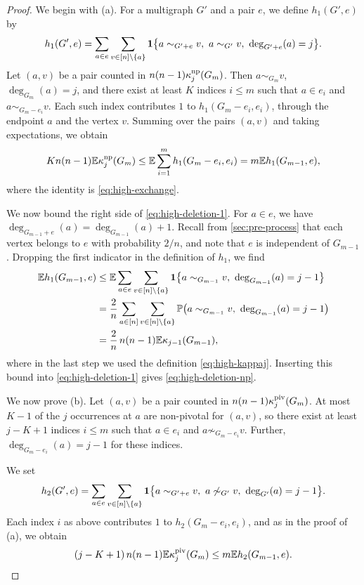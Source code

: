 \begin{proof}
We begin with (a). For a multigraph $G'$ and a pair $e$, we define $h_1(G', e)$ by
\[
h_1(G', e) = \sum_{a \in e} \sum_{v \in [n] \setminus \{a\}} \ind \bigl\{ a \sim_{G' + e} v, \ a \sim_{G'} v, \ \deg_{G' + e}(a) = j \bigr\}.
\]
Let $(a, v)$ be a pair counted in $n(n - 1) \kappa_j^{\rm np}(G_m)$. Then $a \sim_{G_m} v$, $\deg_{G_m}(a) = j$, and there exist at least $K$ indices $i \le m$ such that $a \in e_i$ and $a \sim_{G_m - e_i} v$. Each such index contributes $1$ to $h_1(G_m - e_i, e_i)$, through the endpoint $a$ and the vertex $v$. Summing over the pairs $(a, v)$ and taking expectations, we obtain
\begin{equation}\label{eq:high-deletion-1}
K n (n - 1) \mathbb E \kappa_j^{\rm np}(G_m) \le \mathbb E \sum_{i = 1}^m h_1(G_m - e_i, e_i) = m \mathbb E h_1(G_{m - 1}, e),
\end{equation}
where the identity is \eqref{eq:high-exchange}.

We now bound the right side of \eqref{eq:high-deletion-1}. For $a \in e$, we have $\deg_{G_{m - 1} + e}(a) = \deg_{G_{m - 1}}(a) + 1$. Recall from \cref{sec:pre-process} that each vertex belongs to $e$ with probability $2/n$, and note that $e$ is independent of $G_{m - 1}$. Dropping the first indicator in the definition of $h_1$, we find
\[
\begin{split}
\mathbb E h_1(G_{m - 1}, e) &\le \mathbb E \sum_{a \in e} \sum_{v \in [n] \setminus \{a\}} \mathbf 1 \bigl\{ a \sim_{G_{m - 1}} v, \ \deg_{G_{m - 1}}(a) = j - 1 \bigr\}\\
&= \frac{2}{n} \sum_{a \in [n]} \sum_{v \in [n] \setminus \{a\}} \mathbb P \bigl( a \sim_{G_{m - 1}} v, \ \deg_{G_{m - 1}}(a) = j - 1 \bigr)\\
&= \frac{2}{n} \, n (n - 1) \mathbb E \kappa_{j - 1}(G_{m - 1}),
\end{split}
\]
where in the last step we used the definition \eqref{eq:high-kappaj}. Inserting this bound into \eqref{eq:high-deletion-1} gives \eqref{eq:high-deletion-np}.

We now prove (b). Let $(a, v)$ be a pair counted in $n(n - 1) \kappa_j^{\rm piv}(G_m)$. At most $K - 1$ of the $j$ occurrences at $a$ are non-pivotal for $(a, v)$, so there exist at least $j - K + 1$ indices $i \le m$ such that $a \in e_i$ and $a \not \sim_{G_m - e_i} v$. Further, $\deg_{G_m - e_i}(a) = j - 1$ for these indices.

We set
\[
h_2(G', e) = \sum_{a \in e} \sum_{v \in [n] \setminus \{a\}} \mathbf 1 \bigl\{ a \sim_{G' + e} v, \ a \not \sim_{G'} v, \ \deg_{G'}(a) = j - 1 \bigr\}.
\]
Each index $i$ as above contributes $1$ to $h_2(G_m - e_i, e_i)$, and as in the proof of (a), we obtain
\begin{equation}\label{eq:high-deletion-2}
(j - K + 1) \, n (n - 1) \mathbb E \kappa_j^{\rm piv}(G_m) \le m \mathbb E h_2(G_{m - 1}, e).
\end{equation}


\end{proof}
